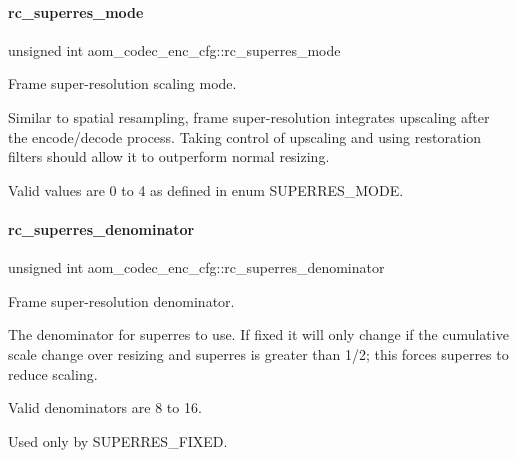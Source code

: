 \paragraph{\texorpdfstring{rc\+\_\+superres\+\_\+mode}{rc\_superres\_mode}}
{\footnotesize\ttfamily unsigned int aom\+\_\+codec\+\_\+enc\+\_\+cfg\+::rc\+\_\+superres\+\_\+mode}



Frame super-\/resolution scaling mode. 

Similar to spatial resampling, frame super-\/resolution integrates upscaling after the encode/decode process. Taking control of upscaling and using restoration filters should allow it to outperform normal resizing.

Valid values are 0 to 4 as defined in enum S\+U\+P\+E\+R\+R\+E\+S\+\_\+\+M\+O\+DE. \mbox{\label{structaom__codec__enc__cfg_a9217f81f33c62161df9d94e42f2b77c6}} 
\paragraph{\texorpdfstring{rc\+\_\+superres\+\_\+denominator}{rc\_superres\_denominator}}
{\footnotesize\ttfamily unsigned int aom\+\_\+codec\+\_\+enc\+\_\+cfg\+::rc\+\_\+superres\+\_\+denominator}



Frame super-\/resolution denominator. 

The denominator for superres to use. If fixed it will only change if the cumulative scale change over resizing and superres is greater than 1/2; this forces superres to reduce scaling.

Valid denominators are 8 to 16.

Used only by S\+U\+P\+E\+R\+R\+E\+S\+\_\+\+F\+I\+X\+ED. \mbox{\label{structaom__codec__enc__cfg_a4b5ed538fedccae4805fec4a58187fa7}} 
